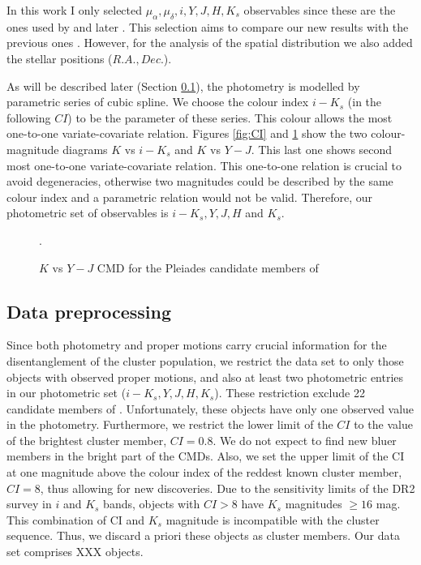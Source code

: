 In this work I only selected $\mu_{\alpha},\mu_{\delta},i,Y,J,H,K_s$ observables since these are the ones used by \citet{Sarro2014} and later \citet{Bouy2015}. This selection aims to compare our new results with the previous ones \citep{Sarro2014,Bouy2015}. However, for the analysis of the spatial distribution we also added the stellar positions ($R.A., Dec.$).

As will be described later (Section \ref{}), the photometry is modelled by parametric series of cubic spline. We choose the colour index $i-K_s$ (in the following $CI$) to be the parameter of these series. This colour allows the most one-to-one variate-covariate relation. Figures \ref{fig:CI} and \ref{fig:otherCI} show the two colour-magnitude diagrams $K$ vs $i-K_s$ and $K$ vs $Y-J$. This last one shows second most one-to-one variate-covariate relation. This one-to-one relation is crucial to avoid degeneracies, otherwise two magnitudes could be described by the same colour index and a parametric relation would not be valid. Therefore, our photometric set of observables is $i-K_s, Y,J,H$ and $K_s$. 


\begin{figure}[htbp]
\begin{center}
\caption{$K$ vs $Y-J$ CMD for the Pleiades candidate members of \citet{Bouy2015}}.
\label{fig:otherCI}
\end{center}
\end{figure}

\subsection{Data preprocessing}
Since both photometry and proper motions carry crucial information for the disentanglement of the cluster population, we restrict the data set to only those objects with observed proper motions, and also at least two photometric entries in our photometric set ($i-K_s,Y,J,H,K_s$). These restriction exclude 22 candidate members of \citet{Bouy2015}. Unfortunately, these objects have only one observed value in the photometry. Furthermore, we restrict the lower limit of the $CI$ to the value of the brightest cluster member, $CI =0.8$. We do not expect to find new bluer members in the bright part of the CMDs. Also, we set the upper limit of the CI at one magnitude above the colour index of the reddest known cluster member, $CI=8$, thus allowing for new discoveries. Due to the sensitivity limits of the DR2 survey in $i$ and $K_s$ bands, objects with $CI>8$ have $K_s$ magnitudes $\geq 16$ mag. This combination of CI and $K_s$ magnitude is incompatible with the cluster sequence. Thus, we discard a priori these objects as cluster members. Our data set comprises XXX objects.

